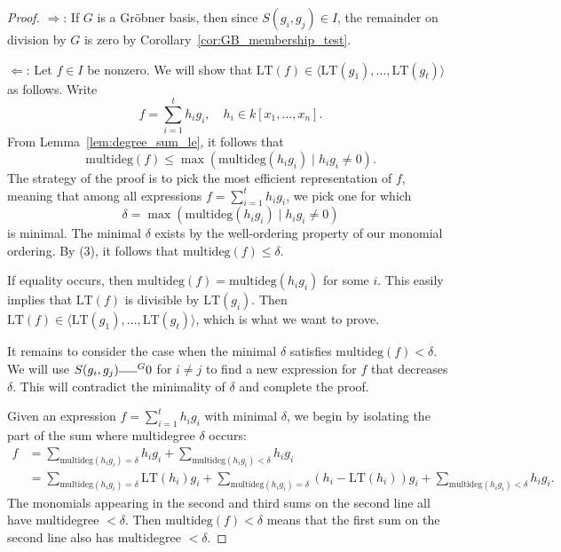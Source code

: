 \begin{proof}
  \leanok
  $\Rightarrow$: If $G$ is a Gr\"obner basis, then since $S(g_i, g_j) \in I$, the remainder on division by $G$ is zero by Corollary~\ref{cor:GB_membership_test}.

  $\Leftarrow$: Let $f \in I$ be nonzero. We will show that $\text{LT}(f) \in \langle\text{LT}(g_1), \dots, \text{LT}(g_t)\rangle$ as follows. Write
  \[
  f = \sum_{i=1}^t h_i g_i, \quad h_i \in k[x_1, \dots, x_n].
  \]
  From Lemma~\ref{lem:degree_sum_le}, it follows that
  \begin{equation} \tag{3}
  \text{multideg}(f) \le \max(\text{multideg}(h_i g_i) \mid h_i g_i \ne 0).
  \end{equation}
  The strategy of the proof is to pick the most efficient representation of $f$, meaning that among all expressions $f = \sum_{i=1}^t h_i g_i$, we pick one for which
  \[
  \delta = \max(\text{multideg}(h_i g_i) \mid h_i g_i \ne 0)
  \]
  is minimal. The minimal $\delta$ exists by the well-ordering property of our monomial ordering. By (3), it follows that $\text{multideg}(f) \le \delta$.

  If equality occurs, then $\text{multideg}(f) = \text{multideg}(h_i g_i)$ for some $i$. 
  This easily implies that $\text{LT}(f)$ is divisible by $\text{LT}(g_i)$. Then $\text{LT}(f) \in \langle\text{LT}(g_1), \dots, \text{LT}(g_t)\rangle$, which is what we want to prove.

  It remains to consider the case when the minimal $\delta$ satisfies $\text{multideg}(f) < \delta$. 
  We will use $S(g_i, g_j) \overline{\hspace{1.5em}}^G 0$ for $i \ne j$ to find a new expression for $f$ that decreases $\delta$. 
  This will contradict the minimality of $\delta$ and complete the proof.

  Given an expression $f = \sum_{i=1}^t h_i g_i$ with minimal $\delta$, we begin by isolating the part of the sum where multidegree $\delta$ occurs:
  \begin{align} \tag{4}
  f &= \sum_{\text{multideg}(h_i g_i) = \delta} h_i g_i + \sum_{\text{multideg}(h_i g_i) < \delta} h_i g_i \\
  &= \sum_{\text{multideg}(h_i g_i) = \delta} \text{LT}(h_i) g_i + \sum_{\text{multideg}(h_i g_i) = \delta} (h_i - \text{LT}(h_i)) g_i + \sum_{\text{multideg}(h_i g_i) < \delta} h_i g_i. \nonumber
  \end{align}
  The monomials appearing in the second and third sums on the second line all have multidegree $<\delta$. 
  Then $\text{multideg}(f) < \delta$ means that the first sum on the second line also has multidegree $<\delta$.


\end{proof}
